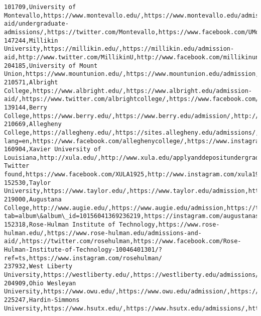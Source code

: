 \documentclass[11pt]{article}
\begin{document}
\begin{Verbatim}[commandchars=\\\{\}]
101709,University of Montevallo,https://www.montevallo.edu/,https://www.montevallo.edu/admissions-aid/undergraduate-admissions/,https://twitter.com/Montevallo,https://www.facebook.com/UMontevallo/,https://www.instagram.com/p/BpaMxwCnYlD/
147244,Millikin University,https://millikin.edu/,https://millikin.edu/admission-aid,http://www.twitter.com/MillikinU,http://www.facebook.com/millikinuniversity,http://www.instagram.com/millikinu
204185,University of Mount Union,https://www.mountunion.edu/,https://www.mountunion.edu/admission,https://twitter.com/mountunion,https://www.facebook.com/UniversityofMountUnion/,https://www.instagram.com/mountunion
210571,Albright College,https://www.albright.edu/,https://www.albright.edu/admission-aid/,https://www.twitter.com/albrightcollege/,https://www.facebook.com/AlbrightCollege/,https://instagram.com/AlbrightCollege/
139144,Berry College,https://www.berry.edu/,https://www.berry.edu/admission/,http://twitter.com/berrycollege,http://www.facebook.com/berrycollege,http://instagram.com/berrycollege
210669,Allegheny College,https://allegheny.edu/,https://sites.allegheny.edu/admissions/,https://twitter.com/alleghenycol?lang=en,https://www.facebook.com/alleghenycollege/,https://www.instagram.com/alleghenycollege/
160904,Xavier University of Louisiana,http://xula.edu/,http://www.xula.edu/applyanddepositundergraduate,No Twitter found,https://www.facebook.com/XULA1925,http://www.instagram.com/xula1925
152530,Taylor University,https://www.taylor.edu/,https://www.taylor.edu/admission,https://twitter.com/tayloru/,https://facebook.com/tayloruniversity/,https://instagram.com/tayloruniv/
219000,Augustana College,http://www.augie.edu/,https://www.augie.edu/admission,https://twitter.com/augustanasd,https://www.facebook.com/pg/AugustanaSD/photos/?tab=album\&album\_id=10156041369236219,https://instagram.com/augustanasd
152318,Rose-Hulman Institute of Technology,https://www.rose-hulman.edu/,https://www.rose-hulman.edu/admissions-and-aid/,https://twitter.com/rosehulman,https://www.facebook.com/Rose-Hulman-Institute-of-Technology-10046401301/?ref=ts,https://www.instagram.com/rosehulman/
237932,West Liberty University,https://westliberty.edu/,https://westliberty.edu/admissions/,https://twitter.com/westlibertyu,https://www.facebook.com/WestLibertyUniversity/,https://instagram.com/discoverwestlib
204909,Ohio Wesleyan University,https://www.owu.edu/,https://www.owu.edu/admission/,https://twitter.com/OhioWesleyan,https://www.facebook.com/OhioWesleyanUniversity,https://instagram.com/ohiowesleyan/
225247,Hardin-Simmons University,https://www.hsutx.edu/,https://www.hsutx.edu/admissions/,https://twitter.com/HSUTX,https://www.facebook.com/hardin.simmons.university/posts/,https://www.instagram.com/hsutx/

\end{Verbatim}
\end{document}
